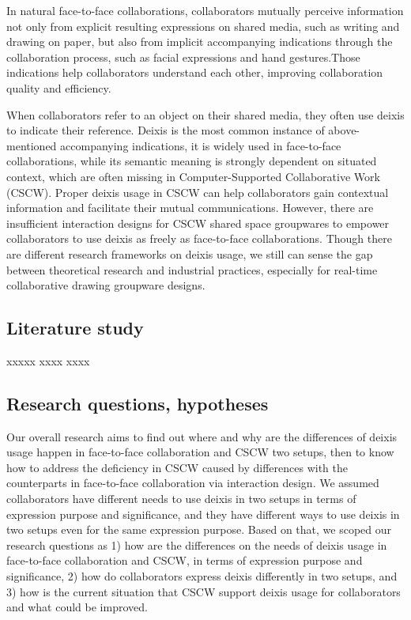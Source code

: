 \documentclass[12pt,twoside]{article}
\begin{document}


In natural face-to-face collaborations, collaborators mutually perceive information not only from explicit resulting expressions on shared media, such as writing and drawing on paper, but also from implicit accompanying indications through the collaboration process, such as facial expressions and hand gestures.Those indications help collaborators understand each other, improving collaboration quality and efficiency.   

When collaborators refer to an object on their shared media, they often use deixis to indicate their reference. Deixis is the most common instance of above-mentioned accompanying indications, it is widely used in face-to-face collaborations, while its semantic meaning is strongly dependent on situated context, which are often missing in Computer-Supported Collaborative Work (CSCW). Proper deixis usage in CSCW can help collaborators gain contextual information and facilitate their mutual communications. However, there are insufficient interaction designs for CSCW shared space groupwares to empower collaborators to use deixis as freely as face-to-face collaborations. Though there are different research frameworks on deixis usage, we still can sense the gap between theoretical research and industrial practices, especially for real-time collaborative drawing groupware designs.

\subsection{Literature study}
\label{sect:literature}

xxxxx xxxx xxxx 

\subsection{Research questions, hypotheses}
\label{sect:questions}

Our overall research aims to find out where and why are the differences of deixis usage happen in face-to-face collaboration and CSCW two setups, then to know how to address the deficiency in CSCW caused by differences with the counterparts in face-to-face collaboration via interaction design. We assumed collaborators have different needs to use deixis in two setups in terms of expression purpose and significance, and they have different ways to use deixis in two setups even for the same expression purpose. Based on that, we scoped our research questions as 1) how are the differences on the needs of deixis usage in face-to-face collaboration and CSCW, in terms of expression purpose and significance, 2) how do collaborators express deixis differently in two setups, and 3) how is the current situation that CSCW support deixis usage for collaborators and what could be improved. 
\end{document}
